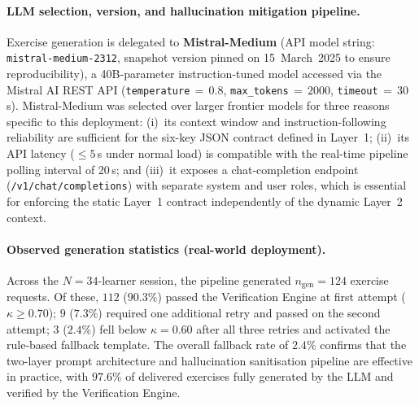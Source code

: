 \documentclass[ASNA,twocolumn]{USG} %
\begin{document}
\paragraph{LLM selection, version, and hallucination mitigation pipeline.}
Exercise generation is delegated to \textbf{Mistral-Medium}
(API model string: \texttt{mistral-medium-2312}, snapshot version
pinned on 15~March~2025 to ensure reproducibility), a
40B-parameter instruction-tuned model accessed via the Mistral AI
REST API
(\texttt{temperature}$\,{=}\,0.8$, \texttt{max\_tokens}$\,{=}\,2000$,
\texttt{timeout}$\,{=}\,30$\,s).
Mistral-Medium was selected over larger frontier models for three
reasons specific to this deployment: (i)~its context window and
instruction-following reliability are sufficient for the
six-key JSON contract defined in Layer~1; (ii)~its API latency
($\leq 5$\,s under normal load) is compatible with the real-time
pipeline polling interval of 20\,s; and (iii)~it exposes a
chat-completion endpoint (\texttt{/v1/chat/completions}) with
separate system and user roles, which is essential for enforcing
the static Layer~1 contract independently of the dynamic
Layer~2 context.

\paragraph{Observed generation statistics (real-world deployment).}
Across the $N{=}34$-learner session, the pipeline generated
$n_{\text{gen}}{=}124$ exercise requests.
Of these, $112$ ($90.3\%$) passed the Verification Engine at
first attempt ($\kappa \geq 0.70$); $9$ ($7.3\%$) required one
additional retry and passed on the second attempt; $3$ ($2.4\%$)
fell below $\kappa{=}0.60$ after all three retries and activated
the rule-based fallback template.
The overall fallback rate of $2.4\%$ confirms that the
two-layer prompt architecture and hallucination sanitisation
pipeline are effective in practice, with $97.6\%$ of delivered
exercises fully generated by the LLM and verified by the
Verification Engine.
\end{document}
